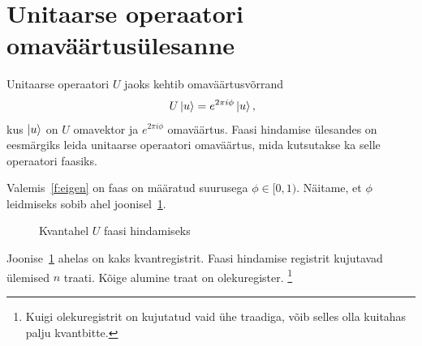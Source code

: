 \documentclass[12pt]{report}
\def\ket#1{\mathinner{|#1\rangle}}
\begin{document}
\section{Unitaarse operaatori omaväärtusülesanne}\label{sec:unitary}

Unitaarse operaatori \(U\) jaoks kehtib omaväärtusvõrrand
\begin{align}\label{f:eigen}
    U \ket{u} = e^{2\pi i\phi} \ket{u}\rlap{,}
\end{align}
kus \(\ket{u}\) on \(U\) omavektor ja \(e^{2\pi i\phi}\) omaväärtus.
Faasi hindamise ülesandes on eesmärgiks leida unitaarse operaatori omaväärtus, mida kutsutakse ka selle operaatori faasiks.

Valemis~\ref{f:eigen} on faas on määratud suurusega \(\phi \in [0, 1)\).
Näitame, et \(\phi\) leidmiseks sobib ahel joonisel~\ref{fig:pea}.

\begin{figure}[h]
    \centering
    \caption{Kvantahel \(U\) faasi hindamiseks \cite{nielnse+chuang, kaye+laflamme+mosca}}
    \label{fig:pea}
\end{figure}

Joonise~\ref{fig:pea} ahelas on kaks kvantregistrit.
Faasi hindamise registrit kujutavad ülemised \(n\) traati.
Kõige alumine traat on olekuregister.%
\footnote{Kuigi olekuregistrit on kujutatud vaid ühe traadiga, võib selles olla kuitahas palju kvantbitte.}
\end{document}
